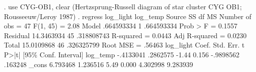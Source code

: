 . use CYG-OB1, clear
(Hertzsprung-Russell diagram of star cluster CYG OB1; Rousseeuw/Leroy 1987)
{\smallskip}
. regress log_light log_temp
{\smallskip}
      Source {\VBAR}       SS           df       MS      Number of obs   =        47
   F(1, 45)        =      2.08
       Model {\VBAR}  .664593334         1  .664593334   Prob > F        =    0.1557
    Residual {\VBAR}  14.3463934        45  .318808743   R-squared       =    0.0443
   Adj R-squared   =    0.0230
       Total {\VBAR}  15.0109868        46  .326325799   Root MSE        =    .56463
{\smallskip}
   log_light {\VBAR}      Coef.   Std. Err.      t    P>|t|     [95\% Conf. Interval]
    log_temp {\VBAR}  -.4133041   .2862575    -1.44   0.156    -.9898562     .163248
       _cons {\VBAR}   6.793468   1.236516     5.49   0.000     4.302998    9.283939
{\smallskip}
